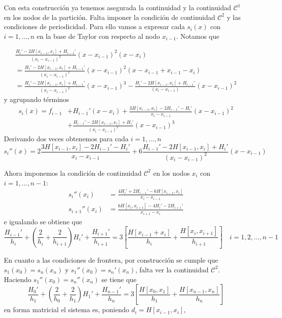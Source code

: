 \documentclass[12pt]{article}
\begin{document}
Con esta construcción ya tenemos asegurada la continuidad y la continuidad $\mathscr{C}^1$ en los nodos de la partición. Falta imponer la condición de continuidad $\mathscr{C}^2$ y las condiciones de periodicidad. Para ello vamos a expresar cada $s_i(x)$ con $i=1,\dots, n$ en la base de Taylor con respecto al nodo $x_{i-1}$. Notamos que 

\begin{multline*}
	\frac{H_i' - 2 H [x_{i-1}, x_i] + H_{i-1}'}{(x_i - x_{i-1})^2} (x - x_{i-1})^2 (x - x_i) \\ = \frac{H_i' - 2 H [x_{i-1}, x_i] + H_{i-1}'}{(x_i - x_{i-1})^2} (x - x_{i-1})^2 (x - x_{i-1} + x_{i-1} - x_i) 
	\\ = \frac{H_i' - 2 H [x_{i-1}, x_i] + H_{i-1}'}{(x_i - x_{i-1})^2} (x - x_{i-1})^3 - \frac{H_i' - 2 H [x_{i-1}, x_i] + H_{i-1}'}{(x_i - x_{i-1})} (x - x_{i-1})^2
\end{multline*}
y agrupando términos
\begin{align*}
	s_i(x) = f_{i-1} &+ H_{i-1}' (x - x_i) + \frac{3 H [x_{i-1}, x_i] -2 H_{i-1}' - H_i'}{x_i - x_{i-1}} ( x-x_{i-1})^2 \\ &+ \frac{H_{i-1}' - 2 H[x_{i-1}, x_i] + H_i'}{(x_i - x_{i-1})^2} (x - x_{i-1})^3
\end{align*}
Derivando dos veces obtenemos para cada $i = 1,\dots, n$
$$s_i''(x) = 2 \frac{3 H [x_{i-1}, x_i] -2 H_{i-1}' - H_i'}{x_i - x_{i-1}} + 6\frac{H_{i-1}' - 2 H[x_{i-1}, x_i] + H_i'}{(x_i - x_{i-1})^2} (x - x_{i-1}) $$


Ahora imponemos la condición de continuidad $\mathscr{C}^2$ en los nodos $x_i$ con $ i = 1, \dots, n - 1$:
\begin{align*}
	s_i''(x_i) &= \frac{4 H_i' + 2 H_{i - 1}' - 6 H[x_{i-1}, x_i]}{x_i - x_{i-1}} \\
	s_{i+1}''(x_i) &= \frac{6 H[x_i, x_{i+1}] - 4 H_i' - 2H_{i+1}'}{x_{i+1}- x_i}
\end{align*}
e igualando se obtiene que 
$$\frac{H_{i-1}'}{h_i} + \left(\frac{2}{h_{i}} + \frac{2}{h_{i+1}}\right) H_i' + \frac{H_{i+1}'}{h_{i+1}} = 3 \left[\frac{H[x_{i-1} + x_i]}{h_i} + \frac{H[x_i, x_{i+1}]}{h_{i+1}}\right] \quad i = 1, 2, \dots, n - 1$$

En cuanto a las condiciones de frontera, por construcción se cumple que $s_1(x_0) = s_n(x_n)$ y $s_1''(x_0) = s_n'(x_n)$, falta ver la continuidad $\mathscr{C}^2$. Haciendo $s_1''(x_0) = s_n''(x_n)$ se tiene que 
$$\frac{H_0'}{h_1} + \left(\frac{2}{h_0} + \frac{2}{h_1}\right) H_1' + \frac{H_{n-1}'}{h_{n}} = 3\left[\frac{H[x_0, x_1]}{h_1} + \frac{H[x_{n-1}, x_n]}{h_n}\right]$$ 
en forma matricial el sistema es, poniendo $d_i = H[x_{i-1}, x_i]$, 
\end{document}
